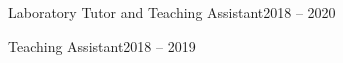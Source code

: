 \begin{cvcontent}
\begin{itemize*}[label=\textcolor{iconcolor}{\textbullet}]
  \end{itemize*}
  \\ [4mm]
  \\ [1mm]
  \begin{itemize*}[label=\textcolor{iconcolor}{\textbullet}]
    \item {}
      {Laboratory Tutor and Teaching Assistant}{2018 -- 2020}\\ [0.5mm]
    \item {}
      {Teaching Assistant}{2018 -- 2019}
  \end{itemize*}
\end{cvcontent}